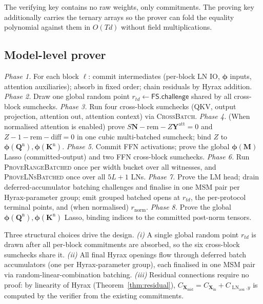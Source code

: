 \documentclass[letterpaper,twocolumn,10pt]{article}
\theoremstyle{remark}
\theoremstyle{definition}
\newcommand{\sys}{\ensuremath{\pi\text{-Former}}}
\newcommand{\bphi}{\boldsymbol{\phi}}
\newcommand{\bM}{\mathbf{M}}
\newcommand{\bN}{\mathbf{N}}
\newcommand{\bX}{\mathbf{X}}
\newcommand{\bY}{\mathbf{Y}}
\newcommand{\bQ}{\mathbf{Q}}
\newcommand{\bK}{\mathbf{K}}
\DeclareMathOperator{\LN}{LN}
\DeclareMathOperator{\Prove}{\mathsf{Prove}}
\DeclareMathOperator{\poppk}{\mathsf{pk}}
\begin{document}
The verifying key contains no raw weights, only commitments. The
proving key additionally carries the ternary arrays so the prover can
fold the equality polynomial against them in $O(Td)$ without field
multiplications.

\subsection{Model-level prover}
\label{ssec:prover}

\begin{algorithm}[H]
\caption{$\sys{}.\Prove(\poppk,W,\mathsf{inst})$ outline}
\label{alg:prove}
\begin{algorithmic}[1]
\State \emph{Phase 1.} For each block $\ell$: commit intermediates
        (per-block LN IO, $\bphi$ inputs, attention auxiliaries);
        absorb in fixed order; chain residuals by Hyrax addition.
\State \emph{Phase 2.} Draw one global random point
        $r_{td}\!\gets\!\mathsf{FS}.\mathsf{challenge}$ shared by all
        cross-block sumchecks.
\State \emph{Phase 3.} Run four cross-block sumchecks (QKV, output
        projection, attention out, attention context) via
        \textsc{CrossBatch}.
\State \emph{Phase 4.} (When normalised attention is enabled) prove
        $S\bN-\mathrm{rem}-Z\bY^{\mathrm{att}}\!=\!0$ and
        $Z\!-\!1\!-\!\mathrm{rem}\!-\!\mathrm{diff}\!=\!0$ in one
        cubic multi-batched sumcheck; bind $Z$ to
        $\bphi(\bQ^{\mathrm n}),\bphi(\bK^{\mathrm n})$.
\State \emph{Phase 5.} Commit FFN activations; prove the global
        $\bphi(\bM)$ Lasso (committed-output) and two FFN cross-block
        sumchecks.
\State \emph{Phase 6.} Run \textsc{ProveRangeBatched} once per width
        bucket over all witnesses, and \textsc{ProveLNsBatched} once
        over all $5L\!+\!1$ LNs.
\State \emph{Phase 7.} Prove the LM head; drain deferred-accumulator
        batching challenges and finalise in one MSM pair per
        Hyrax-parameter group; emit grouped batched opens at $r_{td}$,
        the per-protocol terminal points, and (when normalised)
        $r_{\mathrm{norm}}$.
\State \emph{Phase 8.} Prove the global
        $\bphi(\bQ^{\mathrm n}),\bphi(\bK^{\mathrm n})$ Lasso, binding
        indices to the committed post-norm tensors.
\end{algorithmic}
\end{algorithm}

Three structural choices drive the design. \emph{(i)} A single global
random point $r_{td}$ is drawn after all per-block commitments are
absorbed, so the six cross-block sumchecks share it. \emph{(ii)} All
final Hyrax openings flow through deferred batch accumulators (one per
Hyrax-parameter group), each finalised in one MSM pair via
random-linear-combination batching. \emph{(iii)} Residual connections
require no proof: by linearity of Hyrax (Theorem~\ref{thm:residual}),
$C_{\bX_{\mathrm{mid}}}\!=\!C_{\bX_{\mathrm{in}}}+C_{\LN_{\mathrm{aon}}.y}$
is computed by the verifier from the existing commitments.
\end{document}
